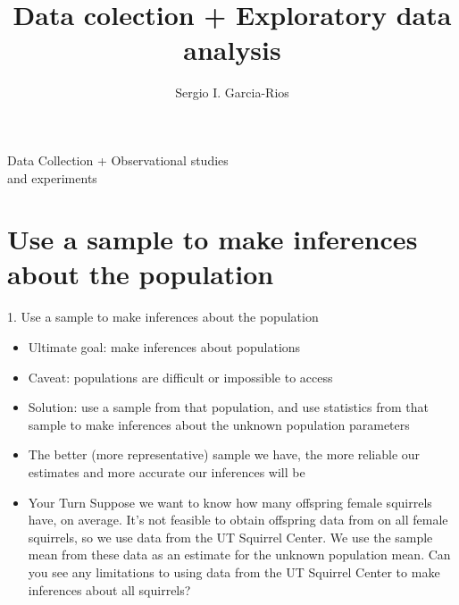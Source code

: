 \documentclass[11pt]{beamer}
\author{Sergio I. Garcia-Rios}
\title{Data colection + Exploratory data analysis}
\institute{LBJ Survey Design and Analysis}
\date{}
\begin{document}
\maketitle

\begin{frame}[standout]
\Large{Data Collection + Observational studies \\ and experiments}
\end{frame}


\section{Use a sample to make inferences about the population}
\label{mi1}


\begin{frame}{1. Use a sample to make inferences about the population}
\small{
\begin{itemize}[<+->]
\item Ultimate goal: make inferences about populations
\item Caveat: populations are difficult or impossible to access
\item Solution: use a sample from that population, and use \alert{statistics} from that 
sample to make inferences about the unknown population \alert{parameters}
\item The better (more \alert{representative}) sample we have, the more reliable our 
estimates and more accurate our inferences will be



\item[] \footnotesize{
\begin{exampleblock}{Your Turn}
Suppose we want to know how many offspring female squirrels have, on average.
It's not feasible to obtain offspring data from on all female squirrels, so we use 
data from the UT Squirrel Center. We use the sample mean from these data as an 
estimate for the unknown population mean. Can you see any limitations to using data 
from the UT Squirrel Center to make inferences about all squirrels?
\end{exampleblock}
}

\end{itemize}
}
\end{frame}

\end{document}
